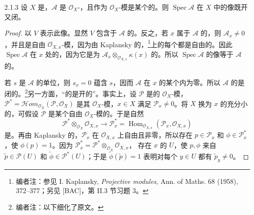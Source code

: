 \begin{SGAresult}{}{2.1.3}
设 $X$ 是，$\mathcal A$ 是 $\mathcal O_X$-，且作为 $\mathcal O_X$-模是某个的。则 $\operatorname{Spec}\mathcal A$ 在 $X$ 中的像既开又闭。
\end{SGAresult}
\begin{proof}
以 $V$ 表示此像。显然 $V$ 包含于 $\mathcal A$ 的。反之，若 $x$ 属于 $\mathcal A$ 的，则 $\mathcal A_x\ne0$，并且是自由 $\mathcal O_{X,x}$-模，因为由 Kaplansky 的，\footnote{编者注：参见 I. Kaplansky, \emph{Projective modules}, Ann. of Maths. 68 (1958), 372--377；另见 [BAC]，第 II.3 节习题 3。}上的每个都是自由的。因此 $\operatorname{Spec}\mathcal A$ 在 $x$ 处的，因为它是为 $\mathcal A_x\otimes_{\mathcal O_{X,x}}\kappa(x)$ 的。所以 $\operatorname{Spec}\mathcal A$ 的像等于 $\mathcal A$ 的。

若 $s$ 是 $\mathcal A$ 的单位，则 $s_x=0$ 蕴含 $s$，因而 $\mathcal A$ 在 $x$ 的某个内为零。所以 $\mathcal A$ 的是闭的。\footnote{编者注：以下细化了原文。}另一方面，“的是开的”。事实上，设 $\mathcal P$ 是的 $\mathcal O_X$-模，$\mathcal P^*=\mathcal H om_{\mathcal O_X}(\mathcal P,\mathcal O_X)$ 是其 $\mathcal O_X$-模，$x\in X$ 满足 $\mathcal P_x\ne0$。将 $X$ 换为 $x$ 的充分小的，可假设 $\mathcal P$ 是某个自由 $\mathcal O_X$-模的。于是自然
\[
\mathcal P^*\otimes_{\mathcal O_X}\mathcal O_{X,x}\longrightarrow\mathcal P_x^*=\operatorname{Hom}_{\mathcal O_{X,x}}(\mathcal P_x,\mathcal O_{X,x})
\]
是。再由 Kaplansky 的，$\mathcal P_x$ 在 $\mathcal O_{X,x}$ 上自由且非零，所以存在 $p\in\mathcal P_x$ 和 $\phi\in\mathcal P_x^*$，使 $\phi(p)=1$。因为 $\mathcal P_x^*=\mathcal P^*\otimes_{\mathcal O_X}\mathcal O_{X,x}$，
存在 $x$ 的 $U$，使 $p,\phi$ 来自 $\widetilde p\in\mathcal P(U)$ 和 $\widetilde\phi\in\mathcal P^*(U)$；于是 $\widetilde\phi(\widetilde p)=1$ 表明对每个 $y\in U$ 都有 $\widetilde p_y\ne0$。
\end{proof}


